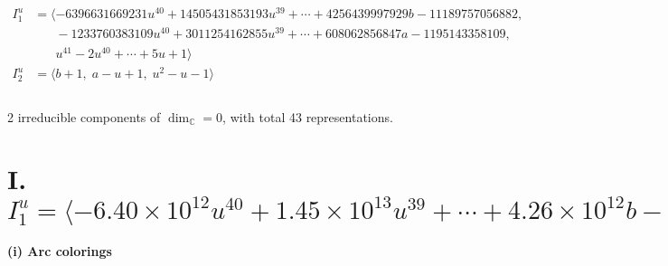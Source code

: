 \documentclass[1p]{elsarticle_modified}
\theoremstyle{definition}
\begin{document}
\begin{align*}
I^u_{1}&=\langle 
-6396631669231 u^{40}+14505431853193 u^{39}+\cdots+4256439997929 b-11189757056882,\\
\phantom{I^u_{1}}&\phantom{= \langle  }-1233760383109 u^{40}+3011254162855 u^{39}+\cdots+608062856847 a-1195143358109,\\
\phantom{I^u_{1}}&\phantom{= \langle  }u^{41}-2 u^{40}+\cdots+5 u+1\rangle \\
I^u_{2}&=\langle 
b+1,\;a- u+1,\;u^2- u-1\rangle \\
\\
\end{align*}
\raggedright * 2 irreducible components of $\dim_{\mathbb{C}}=0$, with total 43 representations.\\
\newpage
\renewcommand{\arraystretch}{1}
\centering \section*{I. $I^u_{1}= \langle -6.40\times10^{12} u^{40}+1.45\times10^{13} u^{39}+\cdots+4.26\times10^{12} b-1.12\times10^{13},\;-1.23\times10^{12} u^{40}+3.01\times10^{12} u^{39}+\cdots+6.08\times10^{11} a-1.20\times10^{12},\;u^{41}-2 u^{40}+\cdots+5 u+1 \rangle$}
\flushleft \textbf{(i) Arc colorings}\\
\end{document}
